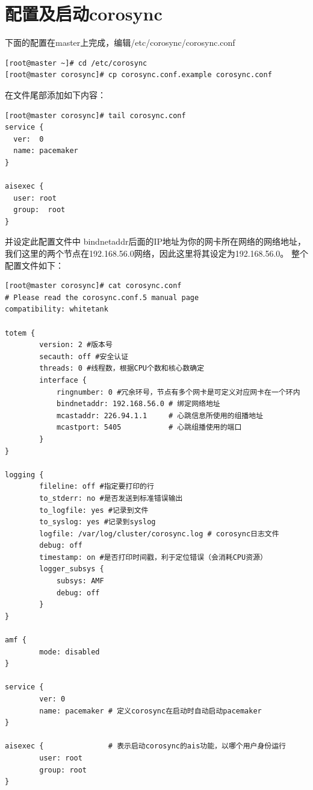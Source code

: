 \section{配置及启动corosync}

下面的配置在master上完成，编辑/etc/corosync/corosync.conf

\begin{verbatim}
[root@master ~]# cd /etc/corosync
[root@master corosync]# cp corosync.conf.example corosync.conf
\end{verbatim}

在文件尾部添加如下内容：

\begin{verbatim}
[root@master corosync]# tail corosync.conf
service {
  ver:  0
  name: pacemaker
}

aisexec {
  user: root
  group:  root
}
\end{verbatim}

并设定此配置文件中 bindnetaddr后面的IP地址为你的网卡所在网络的网络地址，
我们这里的两个节点在192.168.56.0网络，因此这里将其设定为192.168.56.0。
整个配置文件如下：

\begin{verbatim}
[root@master corosync]# cat corosync.conf
# Please read the corosync.conf.5 manual page
compatibility: whitetank

totem {
        version: 2 #版本号
        secauth: off #安全认证
        threads: 0 #线程数，根据CPU个数和核心数确定
        interface {
	        ringnumber: 0 #冗余环号，节点有多个网卡是可定义对应网卡在一个环内
	        bindnetaddr: 192.168.56.0 # 绑定网络地址
	        mcastaddr: 226.94.1.1     # 心跳信息所使用的组播地址
	        mcastport: 5405           # 心跳组播使用的端口
        }
}

logging {
        fileline: off #指定要打印的行
        to_stderr: no #是否发送到标准错误输出
        to_logfile: yes #记录到文件
        to_syslog: yes #记录到syslog
        logfile: /var/log/cluster/corosync.log # corosync日志文件
        debug: off
        timestamp: on #是否打印时间戳，利于定位错误（会消耗CPU资源）
        logger_subsys {
	        subsys: AMF
	        debug: off
        }
}

amf {
        mode: disabled
}

service {
        ver: 0
        name: pacemaker # 定义corosync在启动时自动启动pacemaker
}

aisexec {               # 表示启动corosync的ais功能，以哪个用户身份运行
        user: root
        group: root
}
\end{verbatim}


